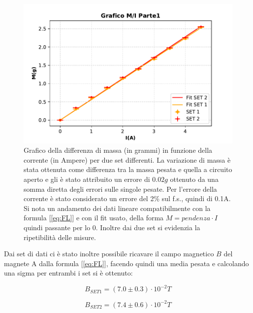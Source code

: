 {\fontsize{12}{14}\selectfont 
\begin{figure}[H]
  \centering
  \includegraphics[width=15cm]{Figures/GraficoMIParte1.pdf}
  \caption{Grafico della differenza di massa (in grammi) in funzione della corrente (in Ampere) per due set differenti. La variazione di massa è stata ottenuta come differenza tra la massa pesata e quella a circuito aperto e gli è stato attribuito un errore di $0.02g$ ottenuto da una somma diretta degli errori sulle singole pesate. Per l'errore della corrente è stato considerato un errore del 2\% sul f.s., quindi di 0.1A. Si nota un andamento dei dati lineare compatibilmente con la formula [\ref{eq:FL}] e con il fit usato, della forma $M = pendenza \cdot I$ quindi passante per lo 0. Inoltre dai due set si evidenzia la ripetibilità delle misure.}   
  \label{fig:GraficoParteI}
\end{figure}

Dai set di dati ci è stato inoltre possibile ricavare il campo magnetico $B$ del magnete A dalla formula [\ref{eq:FL}], facendo quindi una media pesata e calcolando una sigma per entrambi i set si è ottenuto:

\par
\begin{equation*}
    B_{SET1} = (7.0 \pm 0.3)\cdot 10^{-2}T
\end{equation*}

\begin{equation*}
    B_{SET2} = (7.4 \pm 0.6)\cdot 10^{-2}T 
\end{equation*}



}
